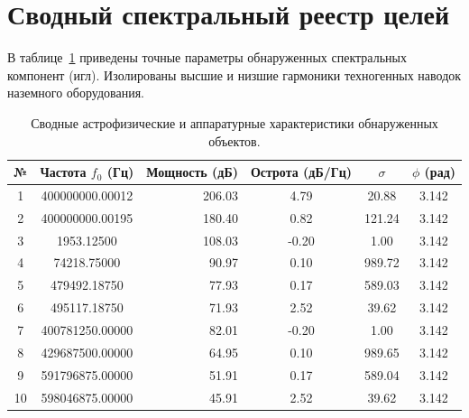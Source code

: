 \documentclass[11pt,twocolumn]{article}
\begin{document}
\section{Сводный спектральный реестр целей}
В таблице~\ref{tab:targets} приведены точные параметры обнаруженных спектральных компонент (игл). 
Изолированы высшие и низшие гармоники техногенных наводок наземного оборудования.\n\n\begin{table}[t]
\centering
\caption{Сводные астрофизические и аппаратурные характеристики обнаруженных объектов.}
\label{tab:targets}
\begin{tabular}{ccrccc}
\toprule
\textbf{№} & \textbf{Частота $f_0$ (Гц)} & \textbf{Мощность (дБ)} & \textbf{Острота (дБ/Гц)} & $\sigma$ & $\phi$ (рад) \\
\midrule
  1 & 400000000.00012 & 206.03 & 4.79 & 20.88 & 3.142 \\
  2 & 400000000.00195 & 180.40 & 0.82 & 121.24 & 3.142 \\
  3 & 1953.12500 & 108.03 & -0.20 & 1.00 & 3.142 \\
  4 & 74218.75000 & 90.97 & 0.10 & 989.72 & 3.142 \\
  5 & 479492.18750 & 77.93 & 0.17 & 589.03 & 3.142 \\
  6 & 495117.18750 & 71.93 & 2.52 & 39.62 & 3.142 \\
  7 & 400781250.00000 & 82.01 & -0.20 & 1.00 & 3.142 \\
  8 & 429687500.00000 & 64.95 & 0.10 & 989.65 & 3.142 \\
  9 & 591796875.00000 & 51.91 & 0.17 & 589.04 & 3.142 \\
  10 & 598046875.00000 & 45.91 & 2.52 & 39.62 & 3.142 \\
\bottomrule
\end{tabular}
\end{table}
\end{document}
